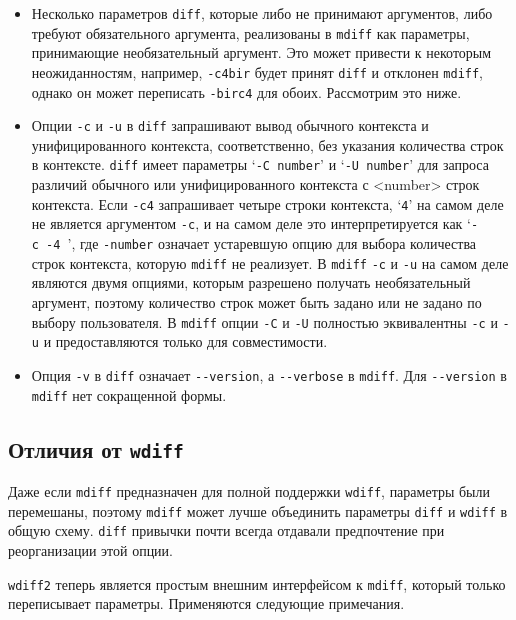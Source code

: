 \begin{itemize}
\item
  Несколько параметров \texttt{diff}, которые либо не принимают
  аргументов, либо требуют обязательного аргумента, реализованы в
  \texttt{mdiff} как параметры, принимающие необязательный аргумент. Это
  может привести к некоторым неожиданностям, например, \texttt{-c4bir}
  будет принят \texttt{diff} и отклонен \texttt{mdiff}, однако он может
  переписать \texttt{-birc4} для обоих. Рассмотрим это ниже.
\item
  Опции \texttt{-c} и \texttt{-u} в \texttt{diff} запрашивают вывод
  обычного контекста и унифицированного контекста, соответственно, без
  указания количества строк в контексте. \texttt{diff} имеет параметры
  `\texttt{-C
  number}' и `\texttt{-U\ number}' для запроса различий обычного или
  унифицированного контекста с \textless number\textgreater{} строк
  контекста. Если \texttt{-c4} запрашивает четыре строки контекста,
  `\texttt{4}' на самом деле не является аргументом \texttt{-c}, и на
  самом деле это интерпретируется как `\texttt{-c\ -4\ }', где
  \texttt{-number} означает устаревшую опцию для выбора количества строк
  контекста, которую \texttt{mdiff} не реализует. В \texttt{mdiff}
  \texttt{-c} и \texttt{-u} на самом деле являются двумя опциями,
  которым разрешено получать необязательный аргумент, поэтому количество
  строк может быть задано или не задано по выбору пользователя. В
  \texttt{mdiff} опции \texttt{-C} и \texttt{-U} полностью эквивалентны
  \texttt{-c} и \texttt{-u} и предоставляются только для совместимости.
\item
  Опция \texttt{-v} в \texttt{diff} означает \texttt{-\/-version}, а
  \texttt{-\/-verbose} в \texttt{mdiff}. Для \texttt{-\/-version} в
  \texttt{mdiff} нет сокращенной формы.
\end{itemize}

\hypertarget{wdiff-Compatibility}{%
\subsection{\texorpdfstring{Отличия от
\texttt{wdiff}}{Отличия от wdiff}}\label{wdiff-Compatibility}}

Даже если \texttt{mdiff} предназначен для полной поддержки
\texttt{wdiff}, параметры были перемешаны, поэтому \texttt{mdiff} может
лучше объединить параметры \texttt{diff} и \texttt{wdiff} в общую схему.
\texttt{diff} привычки почти всегда отдавали предпочтение при
реорганизации этой опции.

\texttt{wdiff2} теперь является простым внешним интерфейсом к
\texttt{mdiff}, который только переписывает параметры. Применяются
следующие примечания.

